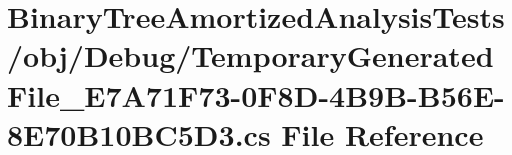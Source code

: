 \hypertarget{_binary_tree_amortized_analysis_tests_2obj_2_debug_2_temporary_generated_file___e7_a71_f73-0_f8_791c0f0b67108443f339ad859ca9582b}{}\section{Binary\+Tree\+Amortized\+Analysis\+Tests/obj/\+Debug/\+Temporary\+Generated\+File\+\_\+\+E7\+A71\+F73-\/0\+F8\+D-\/4\+B9\+B-\/\+B56\+E-\/8\+E70\+B10\+B\+C5\+D3.cs File Reference}
\label{_binary_tree_amortized_analysis_tests_2obj_2_debug_2_temporary_generated_file___e7_a71_f73-0_f8_791c0f0b67108443f339ad859ca9582b}
